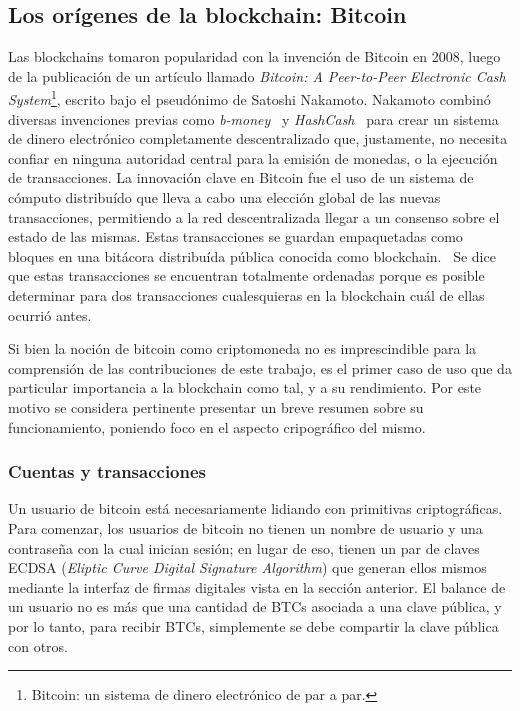 \subsection{Los orígenes de la blockchain: Bitcoin}
Las blockchains tomaron popularidad con la invención de Bitcoin en 2008, luego de la publicación
de un artículo llamado \textit{Bitcoin: A Peer-to-Peer
Electronic Cash System}\footnote{Bitcoin: un sistema de dinero electrónico de par a par.}, escrito
bajo el pseudónimo de Satoshi Nakamoto.
Nakamoto combinó diversas invenciones previas como
\textit{b-money}~\cite{b.money} y \textit{HashCash}~\cite{hashcash} para crear un sistema de dinero electrónico completamente
descentralizado que, justamente, no necesita confiar en ninguna autoridad central para la emisión de monedas,
o la ejecución de transacciones. 
La innovación clave en Bitcoin fue el uso de un sistema de cómputo distribuído que lleva
a cabo una elección global de las nuevas transacciones, permitiendo
a la red descentralizada llegar a un consenso sobre el estado de las mismas. Estas transacciones
se guardan empaquetadas como bloques en una bitácora distribuída pública conocida como blockchain.~\cite{mastering.bitcoin}
%
Se dice que estas transacciones se encuentran totalmente ordenadas porque es posible determinar para
dos transacciones cualesquieras en la blockchain cuál de ellas ocurrió antes.


%
Si bien la noción de bitcoin como criptomoneda no es imprescindible para la comprensión de las
contribuciones de este trabajo, es el primer caso de uso que da particular importancia a la blockchain
como tal, y a su rendimiento. Por este motivo se considera pertinente presentar un breve resumen sobre
su funcionamiento, poniendo foco en el aspecto cripográfico del mismo.

\subsubsection{Cuentas y transacciones}

Un usuario de bitcoin está necesariamente lidiando con primitivas criptográficas.
%
Para comenzar, los usuarios de bitcoin no tienen un nombre de usuario y una contraseña
con la cual inician sesión; en lugar de eso, tienen un par de claves ECDSA (\textit{Eliptic
Curve Digital Signature Algorithm}) que generan ellos mismos mediante la interfaz de firmas
digitales vista en la sección anterior.
%
El balance de un usuario no es más que una cantidad de BTCs asociada a una clave pública,
y por lo tanto, para recibir BTCs, simplemente se debe compartir la clave pública con otros.

